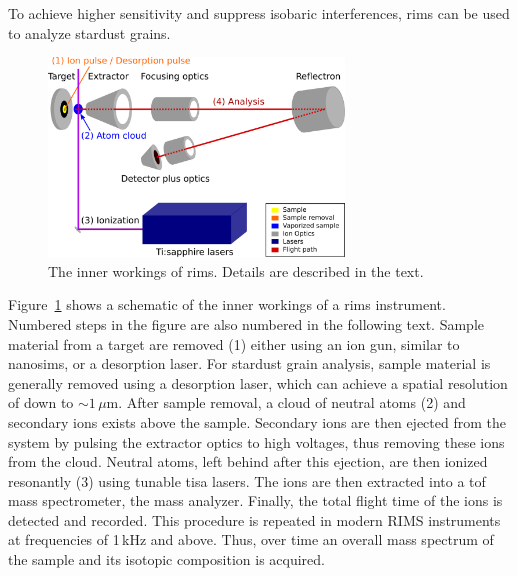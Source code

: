 To achieve higher sensitivity and suppress isobaric interferences, \acf{rims} can be used to analyze stardust grains. 
\begin{figure}[tb]
    \centering
    \includegraphics[width=0.7\textwidth]{graphics/stardust/rims_schematic}
    \caption{The inner workings of \ac{rims}. Details are described in the text.}
    \label{fig:stardust:rims_schematic}
\end{figure}
Figure~\ref{fig:stardust:rims_schematic} shows a schematic of the inner workings of a \ac{rims} instrument. Numbered steps in the figure are also numbered in the following text. Sample material from a target are removed (1) either using an ion gun, similar to \ac{nanosims}, or a desorption laser. For stardust grain analysis, sample material is generally removed using a desorption laser, which can achieve a spatial resolution of down to $\sim1\,\mu$m. After sample removal, a cloud of neutral atoms (2) and secondary ions exists above the sample. Secondary ions are then ejected from the system by pulsing the extractor optics to high voltages, thus removing these ions from the cloud. Neutral atoms, left behind after this ejection, are then ionized resonantly (3) using tunable \acf{tisa} lasers. The ions are then extracted into a \acf{tof} mass spectrometer, the mass analyzer. Finally, the total flight time of the ions is detected and recorded. This procedure is repeated in modern RIMS instruments at frequencies of 1\,kHz and above. Thus, over time an overall mass spectrum of the sample and its isotopic composition is acquired.

